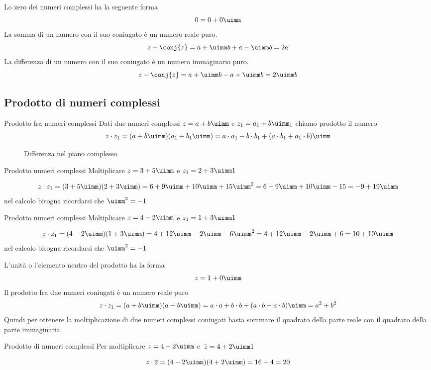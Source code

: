 Lo zero dei numeri complessi ha la seguente forma
\[0=0+0\uimm\]
La somma di un numero con il suo coniugato è un numero reale puro. \[z+\conj{z}=a+\uimm b+a-\uimm b=2a \] 
La differenza di un numero con il suo coniugato è un numero immaginario puro. \[z-\conj{z}=a+\uimm b-a+\uimm b=2\uimm b \] 

\subsection{Prodotto di numeri complessi}
\begin{definizionet}{Prodotto fra numeri complessi}{}
	Dati due numeri complessi  $z=a+b\uimm $ e  $z_1=a_1+b\uimm _1$ chiamo prodotto il numero \[z\cdot z_1=(a+b\uimm)(a_1+b_1\uimm)=a\cdot a_1-b\cdot b_1+(a\cdot b_1+a_1\cdot b)\uimm\]
\end{definizionet}
\begin{figure}
	\centering
	
	\caption{Differenza nel piano complesso}
	\label{fig:DifferenzaPianoComplesso}
\end{figure}
\begin{esempiot}{Prodotto numeri complessi}{}
	Moltiplicare $z=3+5\uimm $ e  $z_1=2+3\uimm1$ 
\end{esempiot}	
	 \[z\cdot z_1=(3+5\uimm)(2+3\uimm)= 6+9\uimm +10\uimm +15\uimm^2=6+9\uimm +10\uimm -15 =-9+19\uimm \]
	nel calcolo bisogna ricordarsi che $\uimm^2=-1$
\begin{esempiot}{Prodotto numeri complessi}{}
	Moltiplicare $z=4-2\uimm $ e  $z_1=1+3\uimm1$  
\end{esempiot}	
	\[z\cdot z_1=(4-2\uimm)(1+3\uimm)= 4+12\uimm -2\uimm -6\uimm^2= 4+12\uimm -2\uimm +6=10+10\uimm \]
	nel calcolo bisogna ricordarsi che $\uimm^2=-1$

L'unità o l'elemento neutro del prodotto ha la forma\[z=1+0\uimm\] 
Il prodotto fra due numeri coniugati  è un numero reale puro
\[z\cdot z_1=(a+b\uimm)(a-b\uimm)=a\cdot a+b\cdot b+(a\cdot b-a\cdot b)\uimm=a^2+b^2\]
Quindi per ottenere la moltiplicazione di due numeri complessi coniugati basta sommare il quadrato della parte reale con il quadrato della parte immaginaria.
\begin{esempiot}{Prodotto di numeri complessi}{}
	Per moltiplicare $z=4-2\uimm $ e\  $\overline{z}=4+2\uimm1$  
\end{esempiot}	
	\[z\cdot \overline{z}=(4-2\uimm)(4+2\uimm)= 16+4=20\]
